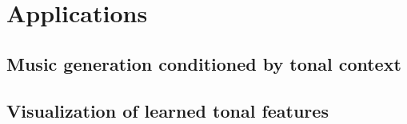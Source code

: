 \chapter{Applications}
\label{chap:chap7}


\section{Music generation conditioned by tonal context}
\section{Visualization of learned tonal features}


